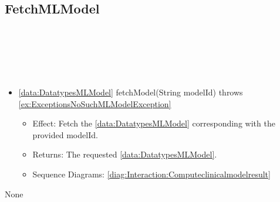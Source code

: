   \subsection{FetchMLModel}\label{int:InterfacesFetchMLModel}
    \begin{description}
      \item[Provided by:] \iconcomponent{}~
      \item[Required by:] \iconcomponent{}~ 
      \item[Operations:] ~
    \begin{itemize}[noitemsep,nolistsep,leftmargin=-.25cm]
      \item \textsf{\ref{data:DatatypesMLModel} fetchModel(String modelId) throws \ref{ex:ExceptionsNoSuchMLModelException}}
        \begin{itemize}[noitemsep,nolistsep]
           \item Effect: Fetch the \ref{data:DatatypesMLModel} corresponding with the provided modelId. 
           \item Returns: The requested \ref{data:DatatypesMLModel}.
           \item Sequence Diagrams: \cref{diag:Interaction:Computeclinicalmodelresult}
        \end{itemize}
    \end{itemize}
      \item[Diagrams:] None
    \end{description}

